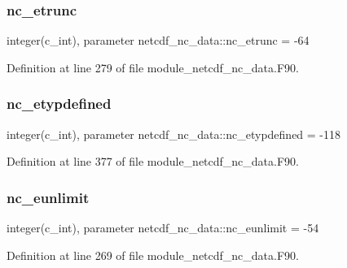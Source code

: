 \mbox{\label{namespacenetcdf__nc__data_a9d18fecf9930af7fe5f7120637546b63}} 
\subsubsection{\texorpdfstring{nc\+\_\+etrunc}{nc\_etrunc}}
{\footnotesize\ttfamily integer(c\+\_\+int), parameter netcdf\+\_\+nc\+\_\+data\+::nc\+\_\+etrunc = -\/64}



Definition at line 279 of file module\+\_\+netcdf\+\_\+nc\+\_\+data.\+F90.

\mbox{\label{namespacenetcdf__nc__data_a0b666565d2bf5ba2a238201461c372bb}} 
\subsubsection{\texorpdfstring{nc\+\_\+etypdefined}{nc\_etypdefined}}
{\footnotesize\ttfamily integer(c\+\_\+int), parameter netcdf\+\_\+nc\+\_\+data\+::nc\+\_\+etypdefined = -\/118}



Definition at line 377 of file module\+\_\+netcdf\+\_\+nc\+\_\+data.\+F90.

\mbox{\label{namespacenetcdf__nc__data_a97e13a4f19397a41377c919316b1f75f}} 
\subsubsection{\texorpdfstring{nc\+\_\+eunlimit}{nc\_eunlimit}}
{\footnotesize\ttfamily integer(c\+\_\+int), parameter netcdf\+\_\+nc\+\_\+data\+::nc\+\_\+eunlimit = -\/54}



Definition at line 269 of file module\+\_\+netcdf\+\_\+nc\+\_\+data.\+F90.

